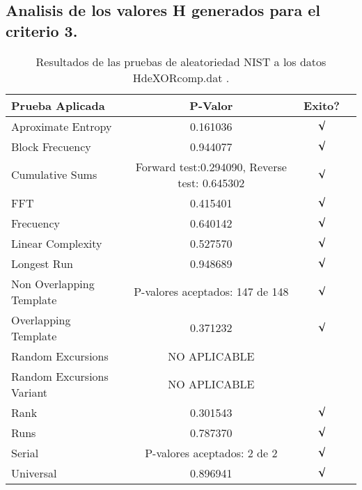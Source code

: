 \documentclass[12pt,3p]{elsarticle}
\begin{document}
\subsection{Analisis de los valores H generados para el criterio 3.}


\begin{table}[H]
\caption{Resultados de las pruebas de aleatoriedad NIST a los datos HdeXORcomp.dat .}
\label{sample-table}
\vskip 0.15in
\begin{center}
\begin{small}
\begin{sc}
\begin{tabular}{lccr}
\hline

Prueba Aplicada &  P-Valor & Exito? \\
\hline

Aproximate Entropy    &   0.161036  & $\surd$ \\

Block Frecuency  & 0.944077  &  $\surd$  \\

Cumulative Sums    &   Forward test:0.294090, Reverse test: 0.645302  & $\surd$ \\

FFT    &   0.415401 &   $\surd$      \\

Frecuency     &  0.640142 &  $\surd$   \\

Linear Complexity      &  0.527570  & $\surd$ \\

Longest Run      &  0.948689 &    $\surd$      \\

Non Overlapping Template      & P-valores aceptados: 147 de 148    &     $\surd$          \\

Overlapping Template      &  0.371232 &        $\surd$       \\

Random Excursions      &  NO APLICABLE &      \\

Random Excursions Variant &  NO APLICABLE  &      \\

Rank &    0.301543  &      $\surd$      \\

Runs &    0.787370  &     $\surd$        \\

Serial &     P-valores aceptados: 2 de 2    &     $\surd$        \\

Universal &      0.896941 &   $\surd$            \\

\hline



\end{tabular}
\end{sc}
\end{small}
\end{center}
\vskip -0.1in
\end{table}
\end{document}
